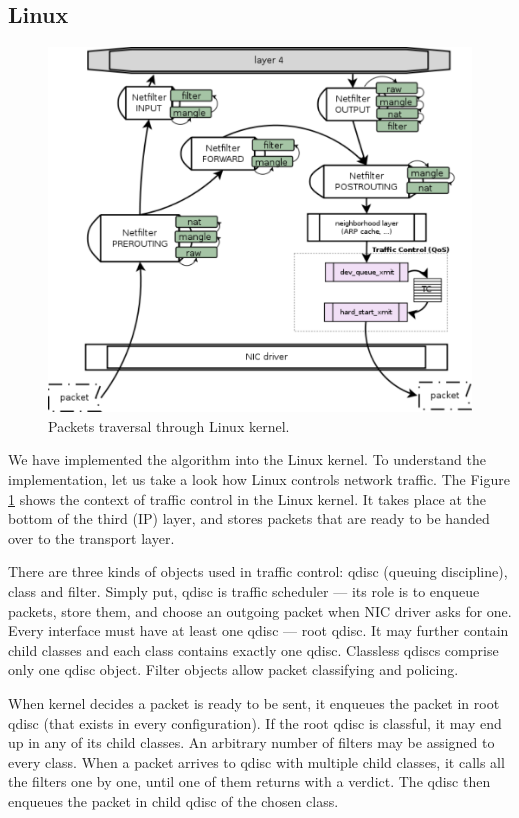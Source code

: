 \subsection {Linux}
\begin{figure}
	\centering
	\includegraphics[width=137mm]{drawings/network_stack}
	\caption{Packets traversal through Linux kernel.}
	\label{fig12:linux}
\end{figure}

We have implemented the algorithm into the Linux kernel. To understand the implementation, let us take a look how Linux controls network traffic. The Figure \ref{fig12:linux} shows the context of traffic control in the Linux kernel. It takes place at the bottom of the third (IP) layer, and stores packets that are ready to be handed over to the transport layer.

There are three kinds of objects used in traffic control: qdisc (queuing discipline), class and filter. Simply put, qdisc is traffic scheduler --- its role is to enqueue packets, store them, and choose an outgoing packet when NIC driver asks for one. Every interface must have at least one qdisc --- root qdisc. It may further contain child classes and each class contains exactly one qdisc. Classless qdiscs comprise only one qdisc object. Filter objects allow packet classifying and policing.

When kernel decides a packet is ready to be sent, it enqueues the packet in root qdisc (that exists in every configuration). If the root qdisc is classful, it may end up in any of its child classes. An arbitrary number of filters may be assigned to every class. When a packet arrives to qdisc with multiple child classes, it calls all the filters one by one, until one of them returns with a verdict. The qdisc then enqueues the packet in child qdisc of the chosen class.

